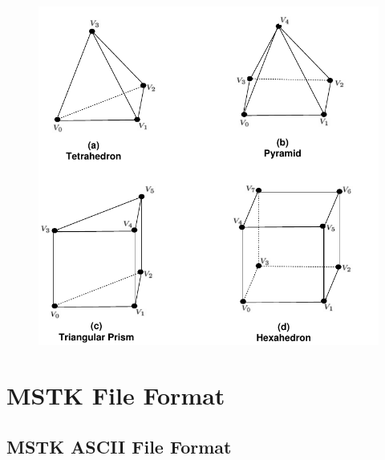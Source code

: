 \documentclass[12pt]{article}
\begin{document}
\begin{figure}[!h]
  \begin{center}
    \includegraphics[scale=1.0]{figures/reg_conventions}
  \end{center}
\end{figure}

\newpage
\section{MSTK File Format}
\label{app:file_format}

\subsection{MSTK ASCII File Format}
\end{document}

